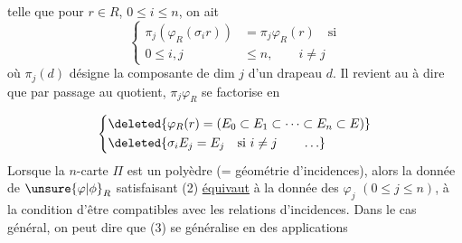 telle que pour $r\in R$, $0\leq i\leq n$, on ait
\[
\left\{\begin{aligned}
\pi_j(\varphi_R(\sigma_i r))&=\pi_j\varphi_R(r)\quad\text{si}\\
0\leq i,j&\leq n,\qquad i\ne j
\end{aligned}\right.
\tag*{(2)}
\]
où $\pi_j(d)$ désigne la composante de dim $j$ d'un drapeau $d$. Il revient au   à dire que par passage au quotient, $\pi_j\varphi_R$ se factorise en


\[
\left\{\begin{aligned}
&\deleted{\varphi_R(r)=(E_0\subset E_1\subset\cdots\subset E_n\subset E)}\\
&\deleted{\sigma_i E_j=E_j\quad\text{si }i\ne j\qquad\ldots}
\end{aligned}\right.
\]
Lorsque la $n$-carte $\Pi$ est un polyèdre (= géométrie d'incidences), alors la donnée de $\unsure{\varphi|\phi}_R$ satisfaisant (2) \uline{équivaut} à la donnée des $\varphi_j$ $(0\leq j\leq n)$,  à la condition d'être compatibles avec les relations d'incidences. Dans le cas général, on peut dire  que (3) se généralise en des applications

